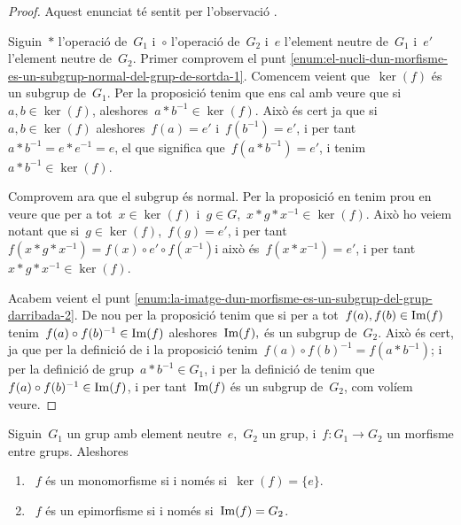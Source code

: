 \documentclass[../estructures-algebraiques.tex]{subfiles}
\begin{document}
    \begin{proof}
        Aquest enunciat té sentit per l'observació .

        Siguin~\(\ast\) l'operació de~\(G_{1}\) i~\(\circ\) l'operació de~\(G_{2}\) i~\(e\) l'element neutre de~\(G_{1}\) i~\(e'\) l'element neutre de~\(G_{2}\).
        Primer comprovem el punt \eqref{enum:el-nucli-dun-morfisme-es-un-subgrup-normal-del-grup-de-sortda-1}.
        Comencem veient que~\(\ker(f)\) és un subgrup de~\(G_{1}\).
        Per la proposició  tenim que ens cal amb veure que si~\(a,b\in\ker(f)\), aleshores~\(a\ast b^{-1}\in\ker(f)\).
        Això és cert ja que si~\(a,b\in\ker(f)\) aleshores~\(f(a)=e'\) i~\(f(b^{-1})=e'\), i per tant~\(a\ast b^{-1}=e\ast e^{-1}=e\), el que significa que~\(f(a\ast b^{-1})=e'\), i tenim~\(a\ast b^{-1}\in\ker(f)\).

        Comprovem ara que el subgrup és normal.
        Per la proposició  en tenim prou en veure que per a tot~\(x\in\ker(f)\) i~\(g\in G\),~\(x\ast g\ast x^{-1}\in\ker(f)\).
        Això ho veiem notant que si~\(g\in\ker(f)\),~\(f(g)=e'\), i per tant~\(f(x\ast g\ast x^{-1})=f(x)\circ e'\circ f(x^{-1})\)i això és~\(f(x\ast x^{-1})=e'\), i per tant~\(x\ast g\ast x^{-1}\in\ker(f)\).

        Acabem veient el punt \eqref{enum:la-imatge-dun-morfisme-es-un-subgrup-del-grup-darribada-2}.
        De nou per la proposició  tenim que si per a tot~\(f(a),f(b)\in\operatorname{Im}(f)\) tenim~\(f(a)\circ f(b)^{-1}\in\operatorname{Im}(f)\) aleshores~\(\operatorname{Im}(f),\) és un subgrup de~\(G_{2}\).
        Això és cert, ja que per la definició de  i la proposició  tenim~\(f(a)\circ f(b)^{-1}=f(a\ast b^{-1})\); i per la definició de grup~\(a\ast b^{-1}\in G_{1}\), i per la definició de  tenim que~\(f(a)\circ f(b)^{-1}\in\operatorname{Im}(f)\), i per tant~\(\operatorname{Im}(f)\) és un subgrup de~\(G_{2}\), com volíem veure.
    \end{proof}
    \begin{proposition}
        \label{prop:condicions-equivalents-a-monomorfisme-i-epimorfisme-per-nucli-i-imatge}
        Siguin~\(G_{1}\) un grup amb element neutre~\(e\),~\(G_{2}\) un grup, i~\(f\colon G_{1}\to G_{2}\) un morfisme entre grups.
        Aleshores
        \begin{enumerate}
            \item\label{enum:condicions-equivalents-a-monomorfisme-i-epimorfisme-per-nucli-i-imatge-1}~\(f\) és un monomorfisme si i només si~\(\ker(f)=\{e\}\).
            \item\label{enum:condicions-equivalents-a-monomorfisme-i-epimorfisme-per-nucli-i-imatge-2}~\(f\) és un epimorfisme si i només si~\(\operatorname{Im}(f)=G_{2}\).
        \end{enumerate}
    \end{proposition}
\end{document}

